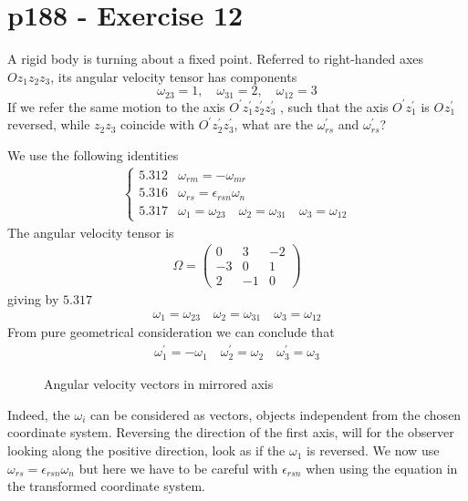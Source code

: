 \section{p188 - Exercise 12}
\begin{tcolorbox}
A rigid body is turning about a fixed point. Referred to right-handed axes $Oz_1z_2z_3$, its angular velocity tensor has components
$$\omega_{23}=1, \quad \omega_{31}=2, \quad\omega_{12}=3$$
If we refer the same motion to the axis  $O^{'}z^{'}_1z^{'}_2z^{'}_3$ , such that the axis $O^{'}z^{'}_1$ is $O^{}z^{'}_1$ reversed, while $z_2z_3$ coincide with $O^{'}z^{'}_2z^{'}_3$, what are the $\omega^{'}_{rs}$ and $\omega^{'}_{rs}$?
\end{tcolorbox}

We use the following identities
\begin{align}
\left\{\begin{array}{ll}
 \mathbf{5.312}& \omega_{rm}=-\omega_{mr}\\
\mathbf{5.316}& \omega_{rs}=\epsilon_{rsn}\omega_{n}\\
\mathbf{5.317}& \omega_{1}= \omega_{23}\quad\omega_{2}= \omega_{31}\quad\omega_{3}= \omega_{12}
\end{array}\right.
\end{align}
The angular velocity tensor is
\begin{align}
\Omega =\left( \begin{matrix}
0&3&-2\\
-3&0&1\\
2&-1&0
\end{matrix}\right)
\end{align}
giving by $\mathbf{5.317}$
\begin{align}
 \omega_{1}= \omega_{23}\quad\omega_{2}= \omega_{31}\quad\omega_{3}= \omega_{12}
 \end{align}
 From pure geometrical consideration we can conclude that
 \begin{align}
 \omega_{1}^{'}= -\omega_{1}^{}\quad\omega_{2}^{'}= \omega_{2}^{}\quad\omega_{3}^{'}= \omega_{3}^{}
 \end{align}
 
\begin{figure}[H]
    \centering
    \subfloat[]{}
\caption{Angular velocity vectors in mirrored axis}
\label{fig:fig_p169_a}
\end{figure}
Indeed, the $\omega_i$ can be considered as vectors, objects independent from the chosen coordinate system. Reversing the direction of the first axis, will for the observer looking along the positive direction, look as if the $\omega_1$ is reversed.
We now use $\omega_{rs}=\epsilon_{rsn}\omega_{n}$ but here we have to be careful with $\epsilon_{rsn}$ when using the equation in the transformed coordinate system.

